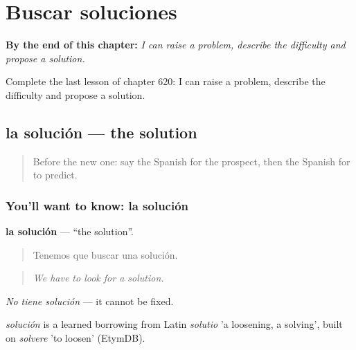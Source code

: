 
\chapter{Buscar soluciones}
\label{ch:es-buscar-soluciones}

\begin{chapteropening}
\textbf{By the end of this chapter:} \emph{I can raise a problem, describe the difficulty and propose a solution.}

Complete the last lesson of chapter 620: I can raise a problem, describe the difficulty and propose a solution.
\end{chapteropening}

\section[la solución]{la solución — the solution}

\label{lesson:ES-C620-solucion}



\begin{quote}
Before the new one: say the Spanish for the prospect, then the Spanish for to predict.
\end{quote}

\subsection*{You'll want to know: la solución}
\textbf{la solución} — \textquotedblleft{}the solution\textquotedblright{}.

\begin{quote}
Tenemos que buscar una solución.
\end{quote}

\begin{quote}
\emph{We have to look for a solution.}
\end{quote}

\emph{No tiene solución} — it cannot be fixed.

\begin{cousinweb}
\emph{solución} is a learned borrowing from Latin \emph{solutio} 'a loosening, a solving', built on \emph{solvere} 'to loosen' (EtymDB).
\end{cousinweb}

